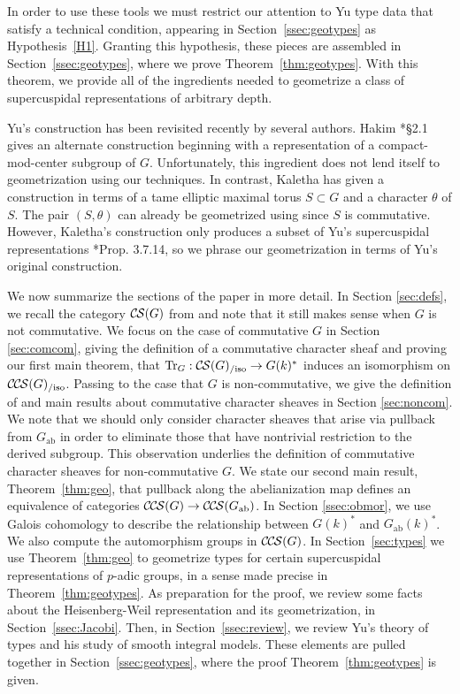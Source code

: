 \documentclass[10pt]{amsart}
\theoremstyle{plain}
\theoremstyle{definition}
\newcommand{\ab}{_{\operatorname{ab}}}
\DeclareMathOperator{\Tr}{Tr}
\newcommand{\TrFrob}[1]{\Tr_{#1}}
\newcommand{\CS}{{\mathcal{C\hskip-0.8pt S}}}
\newcommand{\CCS}{{\mathcal{C\hskip-.8pt C\hskip-0.8pt S}}}
\newcommand{\CSiso}[1]{\CS(#1)_{/\text{iso}}}
\newcommand{\CCSiso}[1]{\CCS(#1)_{/\text{iso}}}
\begin{document}
In order to use these tools we must restrict our attention to Yu type data that satisfy a technical condition, appearing in Section~\ref{ssec:geotypes} as Hypothesis~\ref{H1}. 
Granting this hypothesis, these pieces are assembled in Section~\ref{ssec:geotypes}, where we prove Theorem~\ref{thm:geotypes}.
With this theorem, we provide all of the ingredients needed to geometrize a class of supercuspidal representations of arbitrary depth. 

Yu's construction has been revisited recently by several authors.
Hakim \cite{hakim:18a}*{\S 2.1} gives an alternate construction beginning with a
representation of a compact-mod-center subgroup of $G$.
Unfortunately, this ingredient does not lend itself to geometrization using our techniques.
In contrast, Kaletha \cite{kaletha:19a} has given a construction in terms of a
tame elliptic maximal torus $S \subset G$ and a character $\theta$ of $S$.
The pair $(S, \theta)$ can already be geometrized using \cite{cunningham-roe:13a} since $S$ is commutative.
However, Kaletha's construction only produces a subset of Yu's supercuspidal representations \cite{kaletha:19a}*{Prop. 3.7.14}, so we phrase our geometrization in terms of Yu's original construction.

 
\bigskip

We now summarize the sections of the paper in more detail.
In Section \ref{sec:defs}, we recall the category $\CS(G)$ from \cite{cunningham-roe:13a} and note that it still makes sense when $G$ is not commutative.  
We focus on the case of commutative $G$ in Section \ref{sec:comcom},
giving the definition of a commutative character sheaf and proving our first main theorem, that
$\TrFrob{G} : \CSiso{G} \to G(k)^*$ induces an isomorphism on $\CCSiso{G}$.
Passing to the case that $G$ is non-commutative, we give the definition of and main results about commutative character sheaves in Section \ref{sec:noncom}.  
We note that we should only consider character sheaves that arise via pullback from $G\ab$ in order to eliminate those that have nontrivial restriction to the derived subgroup.  
This observation underlies the definition of commutative character sheaves for non-commutative $G$.  
We state our second main result, Theorem~\ref{thm:geo}, that pullback along the abelianization map defines an equivalence of categories $\CCS(G) \to \CCS(G\ab)$.
In Section \ref{ssec:obmor}, we use Galois cohomology to describe the relationship between $G(k)^*$ and $G\ab(k)^*$.  
We also compute the automorphism groups in $\CCS(G)$.
In Section~\ref{sec:types} we use Theorem~\ref{thm:geo} to geometrize types for certain supercuspidal representations of $p$-adic groups, in a sense made precise in Theorem~\ref{thm:geotypes}.
As preparation for the proof, we review some facts about the Heisenberg-Weil representation and its geometrization, in Section~\ref{ssec:Jacobi}.
Then, in Section~\ref{ssec:review}, we review Yu's theory of types and his study of smooth integral models.  
These elements are pulled together in Section~\ref{ssec:geotypes}, where the proof Theorem~\ref{thm:geotypes} is given.
\end{document}
